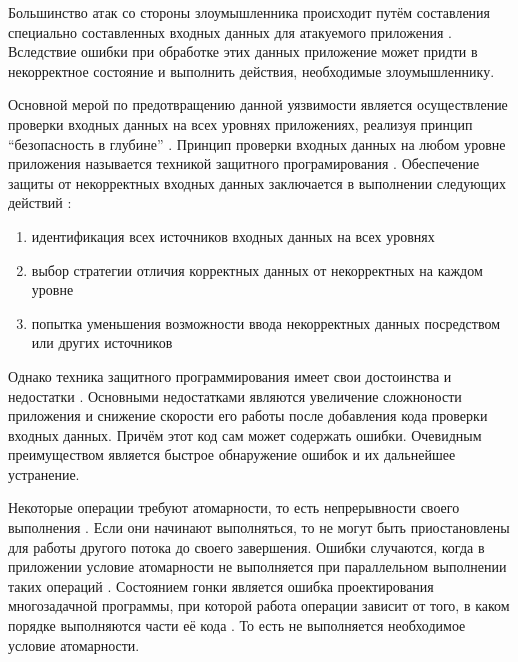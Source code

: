 %
Большинство атак со стороны злоумышленника происходит путём составления специально составленных 
входных данных для атакуемого приложения . 
%
Вследствие ошибки при обработке этих данных приложение может придти в некорректное состояние и 
выполнить действия, необходимые злоумышленнику. 

%
Основной мерой по предотвращению данной уязвимости является осуществление проверки входных данных 
на всех уровнях приложениях, реализуя принцип “безопасность в глубине” . 
%
Принцип проверки входных данных на любом уровне приложения называется техникой защитного 
програмирования . 
%
Обеспечение защиты от некорректных входных данных заключается в выполнении следующих действий 
: 
\begin{enumerate}
	\item идентификация всех источников входных данных на всех уровнях 
	\item выбор стратегии отличия корректных данных от некорректных на каждом уровне 
	\item попытка уменьшения возможности ввода некорректных данных посредством  
		или других источников
\end{enumerate}

%
Однако техника защитного программирования имеет свои достоинства и недостатки 
. 
%
Основными недостатками являются увеличение сложноности приложения и снижение скорости его работы 
после добавления кода проверки входных данных. 
%
Причём этот код сам может содержать ошибки. 
%
Очевидным преимуществом является быстрое обнаружение ошибок и их дальнейшее устранение.


%
Некоторые операции требуют атомарности, то есть непрерывности своего выполнения 
. 
%
Если они начинают выполняться, то не могут быть приостановлены для работы другого потока до своего 
завершения. 
%
Ошибки случаются, когда в приложении условие атомарности не выполняется при параллельном выполнении 
таких операций . 
%
Состоянием гонки является ошибка проектирования многозадачной программы, при которой работа 
операции зависит от того, в каком порядке выполняются части её кода . 
%
То есть не выполняется необходимое условие атомарности.

